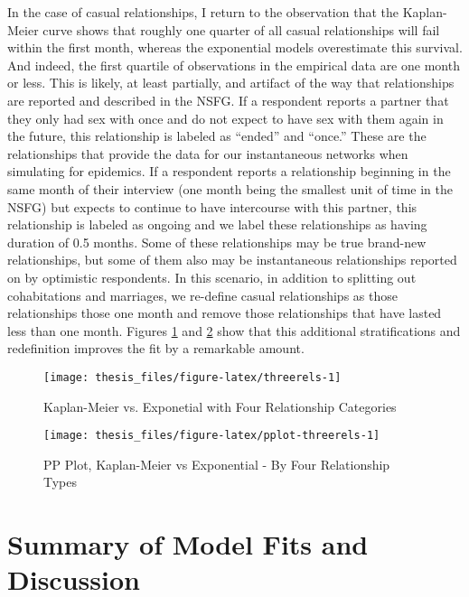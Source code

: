 \documentclass [11pt, proquest] {uwthesis}[2015/03/03]
\begin{document}
In the case of casual relationships, I return to the observation that the Kaplan-Meier curve shows that roughly one quarter of all casual relationships will fail within the first month, whereas the exponential models overestimate this survival. And indeed, the first quartile of observations in the empirical data are one month or less. This is likely, at least partially, and artifact of the way that relationships are reported and described in the NSFG. If a respondent reports a partner that they only had sex with once and do not expect to have sex with them again in the future, this relationship is labeled as ``ended'' and ``once.'' These are the relationships that provide the data for our instantaneous networks when simulating for epidemics. If a respondent reports a relationship beginning in the same month of their interview (one month being the smallest unit of time in the NSFG) but expects to continue to have intercourse with this partner, this relationship is labeled as ongoing and we label these relationships as having duration of 0.5 months. Some of these relationships may be true brand-new relationships, but some of them also may be instantaneous relationships reported on by optimistic respondents. In this scenario, in addition to splitting out cohabitations and marriages, we re-define casual relationships as those relationships those one month and remove those relationships that have lasted less than one month. Figures \ref{fig:threerels} and \ref{fig:pplot-threerels} show that this additional stratifications and redefinition improves the fit by a remarkable amount.
\begin{figure}

{\centering \texttt{[image: thesis\_files/figure-latex/threerels-1]} 

}

\caption{Kaplan-Meier vs. Exponetial with Four Relationship Categories}\label{fig:threerels}
\end{figure}
\begin{figure}

{\centering \texttt{[image: thesis\_files/figure-latex/pplot-threerels-1]} 

}

\caption{PP Plot, Kaplan-Meier vs Exponential - By Four Relationship Types}\label{fig:pplot-threerels}
\end{figure}
\hypertarget{summary-of-model-fits-and-discussion}{%
\section{Summary of Model Fits and Discussion}\label{summary-of-model-fits-and-discussion}}
\end{document}
